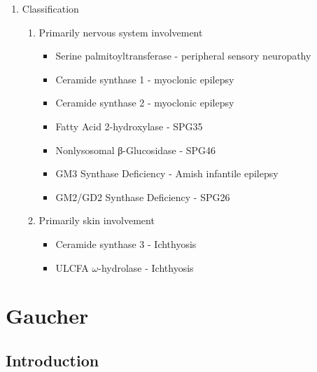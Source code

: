 \documentclass{scrartcl}
\begin{document}
\begin{enumerate}
\item Classification
\label{sec:org38e78fe}

\begin{enumerate}
\item Primarily nervous system involvement
\label{sec:org5b9427c}
\begin{itemize}
\item Serine palmitoyltransferase - peripheral sensory neuropathy
\item Ceramide synthase 1 - myoclonic epilepsy
\item Ceramide synthase 2 - myoclonic epilepsy
\item Fatty Acid 2-hydroxylase - SPG35
\item Nonlysosomal β-Glucosidase - SPG46
\item GM3 Synthase Deficiency - Amish infantile epilepsy
\item GM2/GD2 Synthase Deficiency - SPG26
\end{itemize}


\item Primarily skin involvement
\label{sec:org04b4267}
\begin{itemize}
\item Ceramide synthase 3 - Ichthyosis
\item ULCFA \(\omega\)-hydrolase - Ichthyosis
\end{itemize}
\end{enumerate}
\end{enumerate}

\section{Gaucher}
\label{sec:orgd8d073e}
\subsection{Introduction}
\label{sec:org8910a27}
\end{document}
